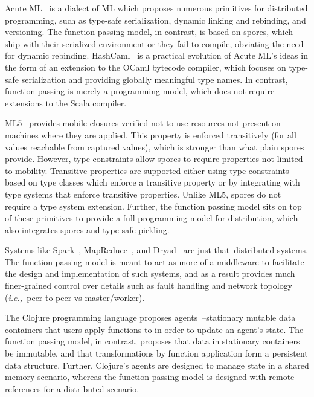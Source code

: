 \documentclass[preprint]{sigplanconf}
\theoremstyle{definition}
\theoremstyle{definition}
\newcommand{\ie}{{\em i.e.,~}}
\begin{document}
Acute ML~\cite{AcuteML} is a dialect of ML which proposes numerous primitives
for distributed programming, such as type-safe serialization, dynamic linking
and rebinding, and versioning. The function passing model, in contrast, is based on spores, which ship
with their serialized environment or they fail to compile, obviating the need
for dynamic rebinding. HashCaml~\cite{DistOCaml} is a practical evolution of
Acute ML's ideas in the form of an extension to the OCaml bytecode compiler,
which focuses on type-safe serialization and providing globally meaningful type
names. In contrast, function passing is merely a programming model, which does not require
extensions to the Scala compiler.


ML5~\cite{Tom7} provides mobile closures verified not to use resources not
present on machines where they are applied. This property is enforced
transitively (for all values reachable from captured values), which is stronger
than what plain spores provide. However, type constraints allow spores to
require properties not limited to mobility. Transitive properties are supported
either using type constraints based on type classes which enforce a transitive
property or by integrating with type systems that enforce transitive
properties. Unlike ML5, spores do not require a type system extension. Further,
the function passing model sits on top of these primitives to provide a full programming
model for distribution, which also integrates spores and type-safe pickling.


Systems like Spark~\cite{Spark}, MapReduce~\cite{MapReduce}, and
Dryad~\cite{Dryad} are just that--distributed systems. The function passing model is meant to act as
more of a middleware to facilitate the design and implementation of such
systems, and as a result provides much finer-grained control over details such
as fault handling and network topology (\ie peer-to-peer vs master/worker).

The Clojure programming language proposes agents~\cite{Clojure}--stationary
mutable data containers that users apply functions to in order to update an
agent's state. The function passing model, in contrast, proposes that data in stationary containers be
immutable, and that transformations by function application form a persistent
data structure. Further, Clojure's agents are designed to manage state in a
shared memory scenario, whereas the function passing model is designed with remote references for a
distributed scenario.
\end{document}
